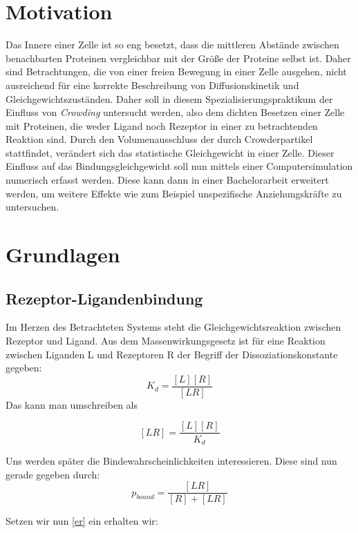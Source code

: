 \documentclass[bachelor,       %
               twoside,        %
               BCOR10mm,       %
               english,ngerman, %
               ]{GAUBM}
\begin{document}
\mainmatter   %

\chapter{Motivation}
Das Innere einer Zelle ist so eng besetzt, dass die mittleren Abstände zwischen
benachbarten Proteinen vergleichbar mit der Größe der Proteine selbst ist.
Daher sind Betrachtungen, die von einer freien Bewegung in einer Zelle ausgehen,
nicht ausreichend für eine korrekte Beschreibung von Diffusionskinetik und Gleichgewichtszuständen.
Daher soll in diesem Spezialisierungspraktikum der Einfluss von \emph{Crowding}
untersucht werden, also dem dichten Besetzen einer Zelle mit Proteinen, die weder
Ligand noch Rezeptor in einer zu betrachtenden Reaktion sind. Durch den
Volumenausschluss der durch Crowderpartikel stattfindet, verändert sich das
statistische Gleichgewicht in einer Zelle. Dieser Einfluss auf das
Bindungsgleichgewicht soll nun mittels einer Computersimulation
numerisch erfasst werden. Diese kann dann in einer Bachelorarbeit erweitert werden,
um weitere Effekte wie zum Beispiel unspezifische Anziehungskräfte zu untersuchen.



\chapter{Grundlagen}
\section{Rezeptor-Ligandenbindung}
Im Herzen des Betrachteten Systems steht die Gleichgewichtsreaktion zwischen
Rezeptor und Ligand. Aus dem Massenwirkungsgesetz ist für eine Reaktion zwischen Liganden
L und Rezeptoren R der Begriff der Dissoziationskonstante gegeben:
\begin{equation}
K_d = \frac{[L][R]}{[LR]}
\end{equation}
Das kann man umschreiben als

\begin{equation}
\label{er}
[LR] = \frac{[L][R]}{K_d}
\end{equation}

Uns werden später die Bindewahrscheinlichkeiten interessieren. Diese sind nun gerade gegeben durch:
\begin{equation}
p_{bound} = \frac{[LR]}{[R]+[LR]}
\end{equation}

Setzen wir nun \ref{er} ein erhalten wir:
\end{document}
